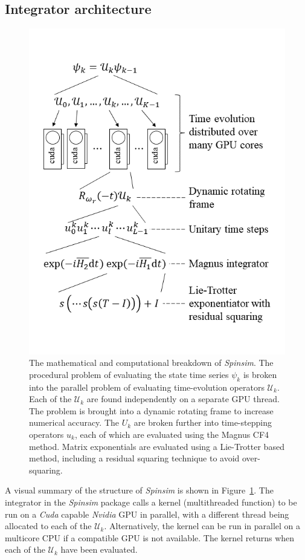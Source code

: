 \documentclass{jors}
\begin{document}
	\subsection{Integrator architecture}
		\begin{figure}[h!]
			\centering
			\includegraphics[scale=0.475]{architecture.png}
			\caption{
				The mathematical and computational breakdown of \emph{Spinsim}.
				The procedural problem of evaluating the state time series $ \psi_k $ is broken into the parallel problem of evaluating time-evolution operators $ \mathcal{U}_k $.
				Each of the $ \mathcal{U}_k $ are found independently on a separate GPU thread.
				The problem is brought into a dynamic rotating frame to increase numerical accuracy.
				The $ U_k $ are broken further into time-stepping operators $ u_k $, each of which are evaluated using the Magnus CF4 method.
				Matrix exponentials are evaluated using a Lie-Trotter based method, including a residual squaring technique to avoid over-squaring.
			}
			\label{fig:architecture}
		\end{figure}
		A visual summary of the structure of \emph{Spinsim} is shown in Figure~\ref{fig:architecture}.
		The integrator in the \emph{Spinsim} package calls a kernel (multithreaded function) to be run on a \emph{Cuda} capable \emph{Nvidia} GPU in parallel, with a different thread being allocated to each of the $ \mathcal{U}_k $.
		Alternatively, the kernel can be run in parallel on a multicore CPU if a compatible GPU is not available.
		The kernel returns when each of the $ \mathcal{U}_k $ have been evaluated.
\end{document}
